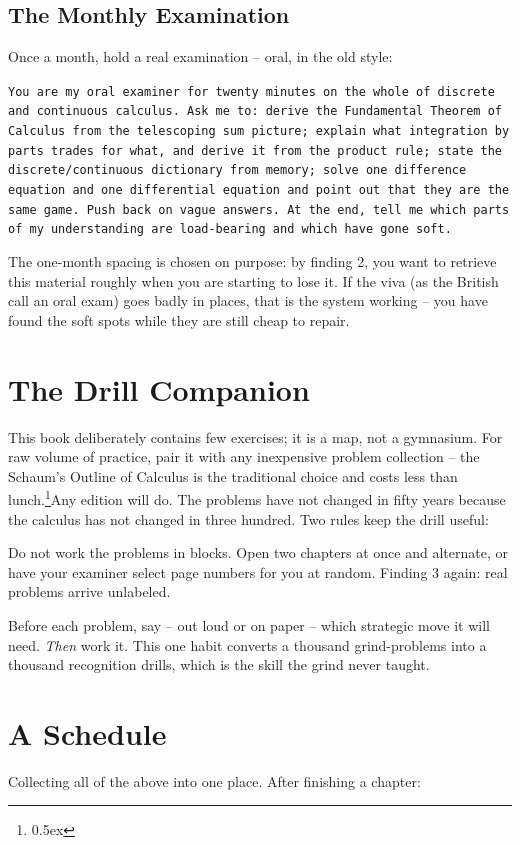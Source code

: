 \subsection{The Monthly Examination}
Once a month, hold a real examination -- oral, in the old style:

{\medskip\narrower\noindent\raggedright {\tt You are my oral examiner for twenty
minutes on the whole of discrete and continuous calculus. Ask me to:
derive the Fundamental Theorem of Calculus from the telescoping sum
picture; explain what integration by parts trades for what, and derive
it from the product rule; state the discrete/continuous dictionary from
memory; solve one difference equation and one differential equation and
point out that they are the same game. Push back on vague answers.
At the end, tell me which parts of my understanding are load-bearing
and which have gone soft.}\par\medskip}

The one-month spacing is chosen on purpose: by finding 2, you want to
retrieve this material roughly when you are starting to lose it. If the
viva (as the British call an oral exam) goes badly in places, that is
the system working -- you have found the soft spots while they are
still cheap to repair.

\section{The Drill Companion}
This book deliberately contains few exercises; it is a map, not a
gymnasium. For raw volume of practice, pair it with any inexpensive
problem collection -- the Schaum's Outline of Calculus is the
traditional choice and costs less than lunch.\footnote{\kern 0.5pt
\raise 0.5ex \hbox{\dag}}{Any edition will do. The problems have not
changed in fifty years because the calculus has not changed in three
hundred.} Two rules keep the drill useful:

\item{Do not work the problems in blocks. Open two chapters at once and
alternate, or have your examiner select page numbers for you at random.
Finding 3 again: real problems arrive unlabeled.}
\item{Before each problem, say -- out loud or on paper -- which
strategic move it will need. {\it Then\/} work it. This one habit
converts a thousand grind-problems into a thousand recognition drills,
which is the skill the grind never taught.}

\section{A Schedule}
Collecting all of the above into one place. After finishing a chapter:

